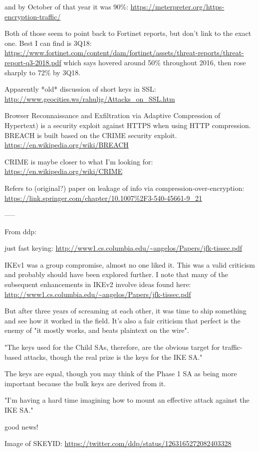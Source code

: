 \documentclass[%
 aip,
 jmp,%
 amsmath,amssymb,
 reprint,%
]{revtex4-1}
\begin{document}
and by October of that year it was 90\%:
\url{https://meterpreter.org/https-encryption-traffic/}

Both of those seem to point back to Fortinet reports, but don't link
to the exact one.  Best I can find is 3Q18:
\url{https://www.fortinet.com/content/dam/fortinet/assets/threat-reports/threat-report-q3-2018.pdf}
which says hovered around 50\% throughout 2016, then rose sharply to
72\% by 3Q18.

Apparently *old* discussion of short keys in SSL:
\url{http://www.geocities.ws/rahuljg/Attacks_on_SSL.htm}

Browser Reconnaissance and Exfiltration via Adaptive Compression of
Hypertext) is a security exploit against HTTPS when using HTTP
compression. BREACH is built based on the CRIME security exploit.
\url{https://en.wikipedia.org/wiki/BREACH}

CRIME is maybe closer to what I'm looking for:
\url{https://en.wikipedia.org/wiki/CRIME}

Refers to (original?) paper on leakage of info via
compression-over-encryption:
\url{https://link.springer.com/chapter/10.1007%2F3-540-45661-9_21}

-----

From ddp:

just fast keying:
\url{http://www1.cs.columbia.edu/~angelos/Papers/jfk-tissec.pdf}

IKEv1 was a group compromise, almost no one liked it.  This was a valid criticism and probably should have been explored further.  I note that many of the subsequent enhancements in IKEv2 involve ideas found here:
\url{http://www1.cs.columbia.edu/~angelos/Papers/jfk-tissec.pdf}

But after three years of screaming at each other, it was time to ship
something and see how it worked in the field.  It's also a fair
criticism that perfect is the enemy of "it mostly works, and beats
plaintext on the wire".

"The keys used for the Child SAs, therefore, are the obvious target for traffic-based attacks, though the real prize is the keys for the IKE SA."

The keys are equal, though you may think of the Phase 1 SA as being
more important because the bulk keys are derived from it.

"I'm having a hard time imagining how to mount an effective attack against the IKE SA."

good news!

Image of SKEYID:
\url{https://twitter.com/ddp/status/1263165272082403328}
\end{document}
